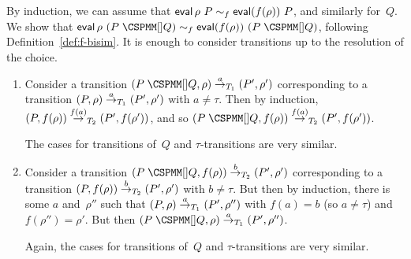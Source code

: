 By induction, we can assume that $\mathop{\sf eval} \rho~P \sim_f \mathop{\sf eval} (f(\rho))~ P$,
and similarly for~$Q$.  We show that $\eval \rho~(P \;\M{[]} Q) \bisim_f \eval
(f(\rho))~ (P \;\M{[]} Q)$, following Definition~\ref{def:f-bisim}.  It
is enough to consider transitions up to the resolution of the choice.
%
\begin{enumerate}
\item Consider a transition $(P\; \M{[]} Q, \rho) \trans{a}_{T_1}
(P', \rho')$ corresponding to a transition $(P, \rho) \stackrel{a}{\rightarrow}_{T_1}
(P',\rho')$ with $a \ne \tau$.  Then by induction, $(P,
f(\rho)) \stackrel{f(a)}{\rightarrow}_{T_2} (P', f(\rho'))$, and so $(P\; \M{[]} Q,
f(\rho)) \trans{f(a)}_{T_2} (P', f(\rho'))$.

The cases for transitions of~$Q$ and $\tau$-transitions are very similar. 

\item Consider a transition $(P\; \M{[]} Q, f(\rho)) \trans{b}_{T_2}
(P', \rho')$ corresponding to a transition $(P, f(\rho)) \stackrel{b}{\rightarrow}_{T_2}
(P', \rho')$ with $b \ne \tau$.  But then by induction, there is some $a$
and~$\rho''$ such that $(P, \rho) \stackrel{a}{\rightarrow}_{T_1} (P', \rho'')$ with $f(a) =
b$ (so $a \ne \tau$) and $f(\rho'') = \rho'$.  But then $(P\; \M{[]}
Q, \rho) \trans{a}_{T_1} (P', \rho'')$.

Again, the cases for transitions of~$Q$ and $\tau$-transitions are very
similar.
\end{enumerate}




